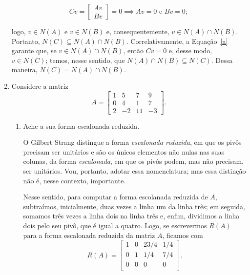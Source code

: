 \documentclass[leqno]{article}
\begin{document}
\begin{enumerate}
\begin{sol}
	    \begin{equation} \label{a}  
	    	Cv = 
		\begin{bmatrix} 
			Av \\ 
			Bv 
		\end{bmatrix} 
		= 0 \implies Av = 0 \text{ e } Bv = 0; 
	    \end{equation} 

	    \noindent logo, $v \in N(A)$ e $v \in N(B)$ e, consequentemente, $v \in N(A) \cap N(B)$. Portanto, $N(C) \subseteq N(A) \cap N(B)$. Correlativamente, a Equação~\eqref{a} garante que, se $v \in N(A) \cap N(B)$, então $Cv = 0$ e, desse modo, $v \in N(C)$; temos, nesse sentido, que $N(A) \cap N(B) \subseteq N(C)$. Dessa maneira, $N(C) = N(A) \cap N(B)$.  
    \end{sol} 

    \item Considere a matriz
        $$A = \begin{bmatrix} 
            1 & 5 & 7 & 9\\
            0 & 4 & 1 & 7 \\
            2 & -2 & 11 & -3
        \end{bmatrix}.$$

        \begin{enumerate}

            \item Ache a sua forma escalonada reduzida.
	    
	    \begin{sol} 
		    O Gilbert Strang \cite[página 89]{strang2006linear} distingue a forma \textit{escalonada reduzida}, em que os pivôs precisam ser unitários e são os únicos elementos não nulas nas suas colunas, da forma \textit{escalonada}, em que os pivôs podem, mas não precisam, ser unitários. Vou, portanto, adotar essa nomenclatura; mas essa distinção não é, nesse contexto, importante. 
		
		    Nesse sentido, para computar a forma escolanada reduzida de $A$, subtraímos, inicialmente, duas vezes a linha um da linha três; em seguida, somamos três vezes a linha dois na linha três e, enfim, dividimos a linha dois pelo seu pivô, que é igual a quatro. Logo, se escrevermos $R(A)$ para a forma escalonada reduzida da matriz $A$, ficamos com 
		\begin{equation*} 
			R(A) = 
			\begin{bmatrix}  
				1 & 0 & 23/4 & 1/4 \\ 
				0 & 1 & 1/4 & 7/4 \\ 
				0 & 0 & 0 & 0 \\ 
			\end{bmatrix}.  
		\end{equation*} 
	    \end{sol} 


\end{enumerate}
\end{enumerate}
\end{document}
